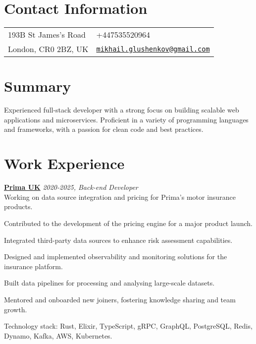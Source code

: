 \documentclass[margin,line]{res}
\begin{document}

\begin{resume}
      \section{\sc Contact Information}
      \vspace{.05in}
      \begin{tabular}{@{}p{2in}p{4in}}
            193B St James's Road &
            +447535520964                           \\
            London, CR0 2BZ, UK  &
            \href{mailto:mikhail.glushenkov@gmail.com}
            {\texttt{mikhail.glushenkov@gmail.com}} \\
      \end{tabular}

      \section{\sc Summary} Experienced full-stack developer with a strong focus
      on building scalable web applications and microservices. Proficient in a
      variety of programming languages and frameworks, with a passion for clean
      code and best practices.

      \section{\sc Work Experience}

       {\bf \href{https://helloprima.co.uk}{Prima UK}} \hfill {\it 2020-2025, Back-end Developer}\\
      Working on data source integration and pricing for Prima's motor insurance
      products.\\
      \begin{list}{}{\leftmargin=1.5em}
            \item Contributed to the development of the pricing engine for a major
                  product launch.
            \item Integrated third-party data sources to enhance risk assessment
                  capabilities.
            \item Designed and implemented observability and monitoring
                  solutions for the insurance platform.
            \item Built data pipelines for processing and analysing large-scale
                  datasets.
            \item Mentored and onboarded new joiners, fostering knowledge sharing
                  and team growth.
      \end{list}
      Technology stack: Rust, Elixir, TypeScript, gRPC, GraphQL, PostgreSQL, Redis, Dynamo, Kafka, AWS, Kubernetes.


\end{resume}
\end{document}
